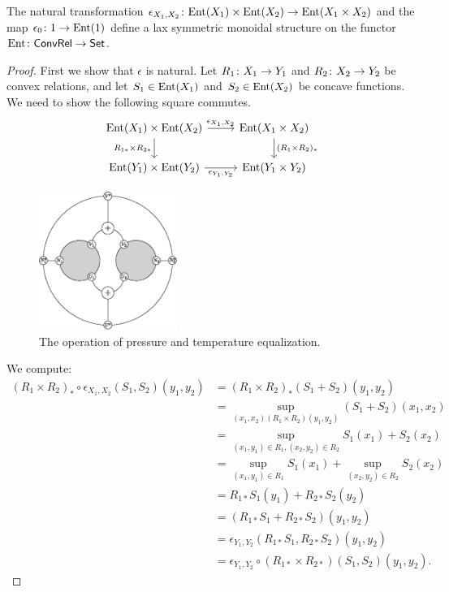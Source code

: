 \documentclass[12pt, reqno]{amsart}
\newcommand{\convrelC}{\cat{ConvRel}}
\begin{document}
\begin{lemma}
\label{thm:lax}
    The natural transformation $\epsilon_{X_1, X_2} \colon \mathrm{Ent}(X_1) \times \mathrm{Ent}(X_2) \rightarrow \mathrm{Ent}(X_1 \times X_2)$ and the map $\epsilon_0 \colon 1 \rightarrow \mathrm{Ent}(1)$ define a lax symmetric monoidal structure on the functor $\Ent \maps \convrelC \to \setC$.
\end{lemma}

\begin{proof}
    First we show that $\epsilon$ is natural. Let $R_1 \colon X_1 \rightarrow Y_1$ and $R_2 \colon X_2 \rightarrow Y_2$ be convex relations, and let $S_1 \in \mathrm{Ent}(X_1)$ and $S_2 \in \mathrm{Ent}(X_2)$ be concave functions. We need to show the following square commutes.
    \[
    \begin{tikzcd}
        \Ent(X_1) \times \Ent(X_2) 
        \arrow[d, swap, "R_{1*} \times R_{2*}"]
        \arrow[r, "\epsilon_{X_1, X_2}"]
        &
        \Ent(X_1 \times X_2)
        \arrow[d, "(R_1 \times R_2)_*"]
        \\
        \Ent(Y_1) \times \Ent(Y_2)
        \arrow[r, swap, "\epsilon_{Y_1, Y_2}"]
        &
        \Ent(Y_1 \times Y_2)
    \end{tikzcd}
    \]
    
\begin{figure}
    \centering
    \includegraphics[width=0.4\textwidth]{figures/two_gases_equalize_pressure.eps}
    \caption{The operation of pressure and temperature equalization.}
    \label{fig:two_gases_equalize_pressure}
\end{figure}    
    We compute:
    \begin{align*}
        (R_1 \times R_2)_* \circ \epsilon_{X_1, X_2} (S_1, S_2) (y_1, y_2)
        &= (R_1 \times R_2)_* (S_1+S_2) (y_1, y_2)
        \\&= \sup_{(x_1, x_2)(R_1 \times R_2)(y_1, y_2)} (S_1+S_2) (x_1, x_2)
        \\&= \sup_{(x_1,y_1) \in R_1, (x_2,y_2) \in R_2} S_1(x_1) + S_2(x_2)
        \\&= \sup_{(x_1,y_1) \in R_1} S_1(x_1) + \sup_{(x_2,y_2) \in R_2} S_2(x_2)
        \\&= R_{1*}S_1(y_1) + R_{2*}S_2(y_2)
        \\&= (R_{1*}S_1 + R_{2*}S_2) (y_1, y_2)
        \\&= \epsilon_{Y_1, Y_2} (R_{1*}S_1, R_{2*}S_2) (y_1, y_2)
        \\&= \epsilon_{Y_1, Y_2} \circ (R_{1*} \times R_{2*}) (S_1, S_2) (y_1, y_2).
    \end{align*}


\end{proof}
\end{document}
